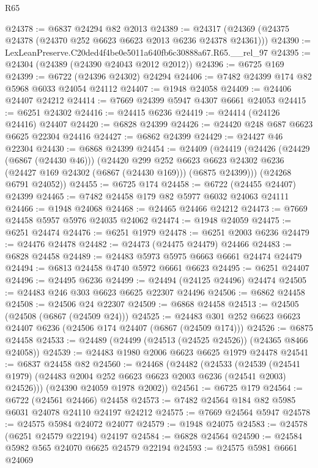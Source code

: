 \begin{lexlean}{R65}
\begin{coremodule}
{@24378 := @6837 @24294 @82 @2013
@24389 := @24317 (@24369 (@24375 @24378 (@24370 @252 @6623 @6623 @2013 @6236 @24378 @24361)))
@24390 := LexLeanPreserve.C20ded4f4be0e5011a640fb6c30888a67.R65.__rel_97
@24395 := @24304 (@24389 (@24390 @24043 @2012 @2012))
@24396 := @6725 @169
@24399 := @6722 (@24396 @24302) @24294
@24406 := @7482 @24399 @174 @82 @5968 @6033 @24054 @24112
@24407 := @1948 @24058
@24409 := @24406 @24407 @24212
@24414 := @7669 @24399 @5947 @4307 @6661 @24053
@24415 := @6251 @24302
@24416 := @24415 @6236
@24419 := @24414 (@24126 @24416) @24407
@24420 := @6828 @24399
@24426 := @24420 @248 @687 @6623 @6625 @22304 @24416
@24427 := @6862 @24399
@24429 := @24427 @46 @22304
@24430 := @6868 @24399
@24454 := @24409
    (@24419
      (@24426
        (@24429 (@6867 (@24430 @46)))
        (@24420
          @299
          @252
          @6623
          @6623
          @24302
          @6236
          (@24427 @169 @24302 (@6867 (@24430 @169)))
          (@6875 @24399)))
      (@24268 @6791 @24052))
@24455 := @6725 @174
@24458 := @6722 (@24455 @24407) @24399
@24465 := @7482 @24458 @179 @82 @5977 @6032 @24063 @24111
@24466 := @1948 @24068
@24468 := @24465 @24466 @24212
@24473 := @7669 @24458 @5957 @5976 @24035 @24062
@24474 := @1948 @24059
@24475 := @6251 @24474
@24476 := @6251 @1979
@24478 := @6251 @2003 @6236
@24479 := @24476 @24478
@24482 := @24473 (@24475 @24479) @24466
@24483 := @6828 @24458
@24489 := @24483 @5973 @5975 @6663 @6661 @24474 @24479
@24494 := @6813 @24458 @4740 @5972 @6661 @6623
@24495 := @6251 @24407
@24496 := @24495 @6236
@24499 := @24494 (@24125 @24496) @24474
@24505 := @24483 @246 @303 @6623 @6625 @22307 @24496
@24506 := @6862 @24458
@24508 := @24506 @24 @22307
@24509 := @6868 @24458
@24513 := @24505 (@24508 (@6867 (@24509 @24)))
@24525 := @24483 @301 @252 @6623 @6623 @24407 @6236 (@24506 @174 @24407 (@6867 (@24509 @174)))
@24526 := @6875 @24458
@24533 := @24489 (@24499 (@24513 (@24525 @24526)) (@24365 @8466 @24058))
@24539 := @24483 @1980 @2006 @6623 @6625 @1979 @24478
@24541 := @6837 @24458 @82
@24560 := @24468
    (@24482
      (@24533
        (@24539 (@24541 @1979) (@24483 @2004 @252 @6623 @6623 @2003 @6236 (@24541 @2003) @24526)))
      (@24390 @24059 @1978 @2002))
@24561 := @6725 @179
@24564 := @6722 (@24561 @24466) @24458
@24573 := @7482 @24564 @184 @82 @5985 @6031 @24078 @24110 @24197 @24212
@24575 := @7669 @24564 @5947
@24578 := @24575 @5984 @24072 @24077
@24579 := @1948 @24075
@24583 := @24578 (@6251 @24579 @22194) @24197
@24584 := @6828 @24564
@24590 := @24584 @5982 @565 @24070 @6625 @24579 @22194
@24593 := @24575 @5981 @6661 @24069
}
\end{coremodule}
\end{lexlean}
